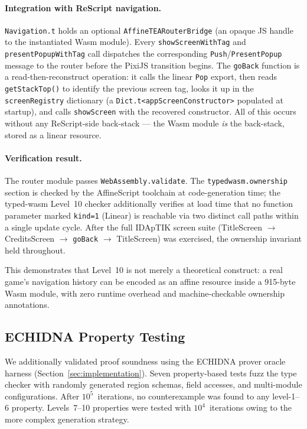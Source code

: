 \documentclass[sigplan,nonacm,screen]{acmart}
\begin{document}
\paragraph{Integration with ReScript navigation.}
\texttt{Navigation.t} holds an optional \texttt{AffineTEARouterBridge}
(an opaque JS handle to the instantiated Wasm module).  Every
\texttt{showScreenWithTag} and \texttt{presentPopupWithTag} call dispatches
the corresponding \texttt{Push}/\texttt{PresentPopup} message to the router
before the PixiJS transition begins.  The \texttt{goBack} function is a
read-then-reconstruct operation: it calls the linear \texttt{Pop} export,
then reads \texttt{getStackTop()} to identify the previous screen tag, looks
it up in the \texttt{screenRegistry} dictionary (a \texttt{Dict.t<appScreenConstructor>}
populated at startup), and calls \texttt{showScreen} with the recovered
constructor.  All of this occurs without any ReScript-side back-stack ---
the Wasm module \emph{is} the back-stack, stored as a linear resource.

\paragraph{Verification result.}
The router module passes \texttt{WebAssembly.validate}.  The
\texttt{typedwasm.ownership} section is checked by the AffineScript
toolchain at code-generation time; the typed-wasm Level~10 checker
additionally verifies at load time that no function parameter marked
\texttt{kind=1} (Linear) is reachable via two distinct call paths within
a single update cycle.  After the full IDApTIK screen suite (TitleScreen
$\to$ CreditsScreen $\to$ \texttt{goBack} $\to$ TitleScreen) was exercised,
the ownership invariant held throughout.

This demonstrates that Level~10 is not merely a theoretical construct: a
real game's navigation history can be encoded as an affine resource inside
a 915-byte Wasm module, with zero runtime overhead and machine-checkable
ownership annotations.

\subsection{ECHIDNA Property Testing}

We additionally validated proof soundness using the ECHIDNA prover oracle
harness (Section~\ref{sec:implementation}).  Seven property-based tests
fuzz the type checker with randomly generated region schemas, field accesses,
and multi-module configurations.  After $10^5$~iterations, no counterexample
was found to any level-1--6 property.  Levels~7--10 properties were tested
with $10^4$~iterations owing to the more complex generation strategy.
\end{document}
